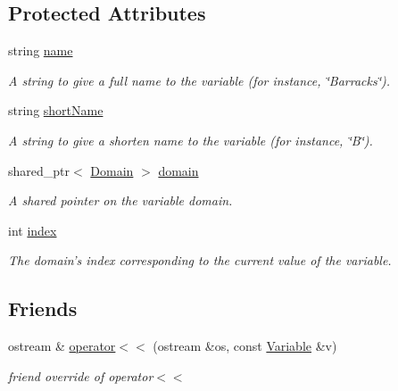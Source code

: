 \subsection*{Protected Attributes}
\begin{DoxyCompactItemize}
\item 
string \hyperlink{classghost_1_1Variable_a05cf4a4cd3a5c033028e0b0f11d1dafd}{name}
\begin{DoxyCompactList}\small\item\em A string to give a full name to the variable (for instance, \char`\"{}\-Barracks\char`\"{}). \end{DoxyCompactList}\item 
string \hyperlink{classghost_1_1Variable_afb5eb79a7f6351b4305fe082699b6d7d}{short\-Name}
\begin{DoxyCompactList}\small\item\em A string to give a shorten name to the variable (for instance, \char`\"{}\-B\char`\"{}). \end{DoxyCompactList}\item 
shared\-\_\-ptr$<$ \hyperlink{classghost_1_1Domain}{Domain} $>$ \hyperlink{classghost_1_1Variable_a78be8576a9911272d521132a2e860514}{domain}
\begin{DoxyCompactList}\small\item\em A shared pointer on the variable domain. \end{DoxyCompactList}\item 
int \hyperlink{classghost_1_1Variable_a934efa463fb1897b4266040e321dbc41}{index}
\begin{DoxyCompactList}\small\item\em The domain's index corresponding to the current value of the variable. \end{DoxyCompactList}\end{DoxyCompactItemize}
\subsection*{Friends}
\begin{DoxyCompactItemize}
\item 
ostream \& \hyperlink{classghost_1_1Variable_af674a590cfa8082686f61b22cbb15790}{operator$<$$<$} (ostream \&os, const \hyperlink{classghost_1_1Variable}{Variable} \&v)
\begin{DoxyCompactList}\small\item\em friend override of operator$<$$<$ \end{DoxyCompactList}\end{DoxyCompactItemize}


